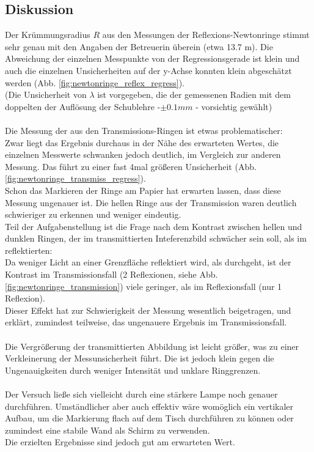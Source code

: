 \documentclass[12pt,a4paper]{article}
\begin{document}
\begin{multicols}{2}

\subsection{Diskussion}

Der Krümmungsradius $R$ aus den Messungen der Reflexions-Newtonringe stimmt sehr genau mit den Angaben der Betreuerin überein (etwa 13.7 m). Die Abweichung der einzelnen Messpunkte von der Regressionsgerade ist klein und auch die einzelnen Unsicherheiten auf der y-Achse konnten klein abgeschätzt werden (Abb. \ref{fig:newtonringe_reflex_regress}).
\\
(Die Unsicherheit von $\lambda$ ist vorgegeben, die der gemessenen Radien mit dem doppelten der Auflösung der Schublehre -$\pm 0.1 mm$ -  vorsichtig gewählt)
\\
\\
Die Messung der aus den Transmissions-Ringen ist etwas problematischer:\\
Zwar liegt das Ergebnis durchaus in der Nähe des erwarteten Wertes, die einzelnen Messwerte schwanken jedoch deutlich, im Vergleich zur anderen Messung. Das führt zu einer fast 4mal größeren Unsicherheit (Abb. \ref{fig:newtonringe_transmiss_regress}).\\
Schon das Markieren der Ringe am Papier hat erwarten lassen, dass diese Messung ungenauer ist. Die hellen Ringe aus der Transmission waren deutlich schwieriger zu erkennen und weniger eindeutig.\\
Teil der Aufgabenstellung ist die Frage nach dem Kontrast zwischen hellen und dunklen Ringen, der im transmittierten Inteferenzbild schwächer sein soll, als im reflektierten:\\
Da weniger Licht an einer Grenzfläche reflektiert wird, als durchgeht, ist der Kontrast im Transmissionsfall (2 Reflexionen, siehe Abb. \ref{fig:newtonringe_transmission}) viele geringer, als im Reflexionsfall (nur 1 Reflexion).\\
Dieser Effekt hat zur Schwierigkeit der Messung wesentlich beigetragen, und erklärt, zumindest teilweise, das ungenauere Ergebnis im Transmissionsfall.\\
\\
Die Vergrößerung der transmittierten Abbildung ist leicht größer, was zu einer Verkleinerung der Messunsicherheit führt. Die ist jedoch klein gegen die Ungenauigkeiten durch weniger Intensität und unklare Ringgrenzen.\\
\\
Der Versuch ließe sich vielleicht durch eine stärkere Lampe noch genauer durchführen. Umständlicher aber auch effektiv wäre womöglich ein vertikaler Aufbau, um die Markierung flach auf dem Tisch durchführen zu können oder zumindest eine stabile Wand als Schirm zu verwenden.\\
Die erzielten Ergebnisse sind jedoch gut am erwarteten Wert.


\end{multicols}
\end{document}
